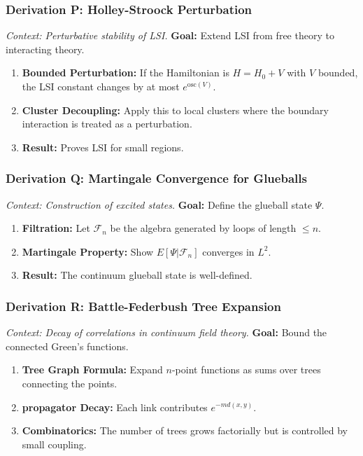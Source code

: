 \subsubsection{Derivation P: Holley-Stroock Perturbation}
\textit{Context: Perturbative stability of LSI.}
\textbf{Goal:} Extend LSI from free theory to interacting theory.
\begin{enumerate}
    \item \textbf{Bounded Perturbation:} If the Hamiltonian is $H = H_0 + V$ with $V$ bounded, the LSI constant changes by at most $e^{\text{osc}(V)}$.
    \item \textbf{Cluster Decoupling:} Apply this to local clusters where the boundary interaction is treated as a perturbation.
    \item \textbf{Result:} Proves LSI for small regions.
\end{enumerate}

\subsubsection{Derivation Q: Martingale Convergence for Glueballs}
\textit{Context: Construction of excited states.}
\textbf{Goal:} Define the glueball state $\Psi$.
\begin{enumerate}
    \item \textbf{Filtration:} Let $\mathcal{F}_n$ be the algebra generated by loops of length $\le n$.
    \item \textbf{Martingale Property:} Show $E[\Psi | \mathcal{F}_n]$ converges in $L^2$.
    \item \textbf{Result:} The continuum glueball state is well-defined.
\end{enumerate}

\subsubsection{Derivation R: Battle-Federbush Tree Expansion}
\textit{Context: Decay of correlations in continuum field theory.}
\textbf{Goal:} Bound the connected Green's functions.
\begin{enumerate}
    \item \textbf{Tree Graph Formula:} Expand $n$-point functions as sums over trees connecting the points.
    \item \textbf{propagator Decay:} Each link contributes $e^{-m d(x,y)}$.
    \item \textbf{Combinatorics:} The number of trees grows factorially but is controlled by small coupling.
\end{enumerate}

